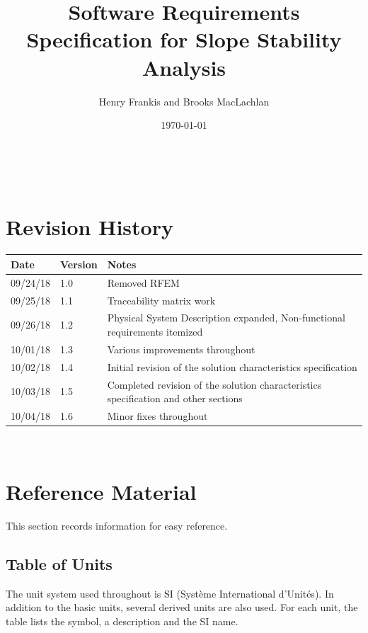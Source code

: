 \documentclass[12pt]{article}
\begin{document}
\title{Software Requirements Specification for Slope Stability Analysis}
\author{Henry Frankis and Brooks MacLachlan}
\date{\today}
	
\maketitle

~\newpage


\section{Revision History}

\begin{tabularx}{\textwidth}{p{3cm}p{2cm}X}
	\toprule {\bf Date} & {\bf Version} & {\bf Notes}\\
	\midrule
	09/24/18 & 1.0 & Removed RFEM\\
	09/25/18 & 1.1 & Traceability matrix work\\
	09/26/18 & 1.2 & Physical System Description expanded, Non-functional 
	requirements itemized\\
	10/01/18 & 1.3 & Various improvements throughout\\
	10/02/18 & 1.4 & Initial revision of the solution characteristics 
	specification\\
	10/03/18 & 1.5 & Completed revision of the solution characteristics 
	specification and other sections\\
	10/04/18 & 1.6 & Minor fixes throughout\\
	\bottomrule
\end{tabularx}

~\newpage

\section{Reference Material} \label{sec_RefMat}
This section records information for easy reference.
\subsection{Table of Units}

The unit system used throughout is SI (Syst\`{e}me International d'Unit\'{e}s). 
In
 addition to the basic units, several derived units are also used. For each 
 unit, the table
 lists the symbol, a description and the SI name.
\newline
\end{document}
